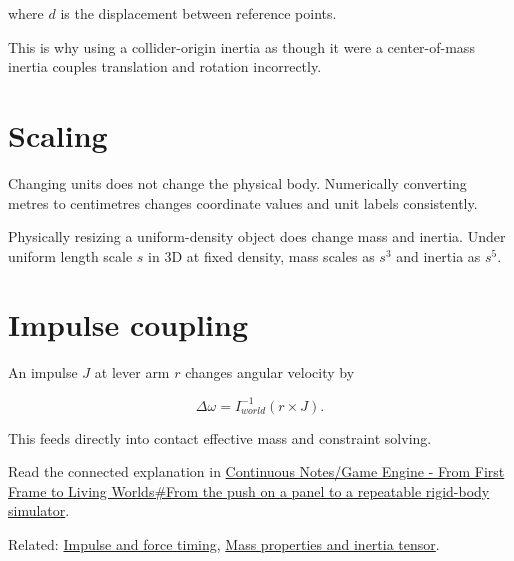 where \(d\) is the displacement between reference points.

This is why using a collider-origin inertia as though it were a center-of-mass inertia couples translation and rotation incorrectly.

\section{Scaling}\label{appendix-66742099f8a0-scaling}

Changing units does not change the physical body. Numerically converting metres to centimetres changes coordinate values and unit labels consistently.

Physically resizing a uniform-density object does change mass and inertia. Under uniform length scale \(s\) in 3D at fixed density, mass scales as \(s^3\) and inertia as \(s^5\).

\section{Impulse coupling}\label{appendix-66742099f8a0-impulse-coupling}

An impulse \(J\) at lever arm \(r\) changes angular velocity by

\[
\Delta\omega=I^{-1}_{world}(r\times J).
\]

This feeds directly into contact effective mass and constraint solving.

Read the connected explanation in \href{Continuous\%20Notes/Game\%20Engine\%20-\%20From\%20First\%20Frame\%20to\%20Living\%20Worlds\#From\%20the\%20push\%20on\%20a\%20panel\%20to\%20a\%20repeatable\%20rigid-body\%20simulator}{Continuous Notes/Game Engine - From First Frame to Living Worlds\#From the push on a panel to a repeatable rigid-body simulator}.

Related: \hyperref[appendix-c39931e6e4c2]{Impulse and force timing}, \href{Continuous\%20Notes/Game\%20Engine\%20-\%20From\%20First\%20Frame\%20to\%20Living\%20Worlds\#Part\%201637\%20—\%20Composite-body\%20mass\%20properties}{Mass properties and inertia tensor}.
